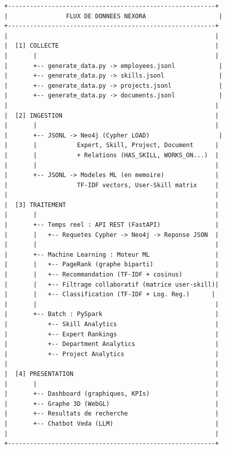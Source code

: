 \documentclass[12pt,a4paper]{article}
\begin{document}
\begin{verbatim}
  +---------------------------------------------------------+
  |                FLUX DE DONNEES NEXORA                    |
  +---------------------------------------------------------+
  |                                                         |
  |  [1] COLLECTE                                           |
  |       |                                                 |
  |       +-- generate_data.py -> employees.jsonl            |
  |       +-- generate_data.py -> skills.jsonl               |
  |       +-- generate_data.py -> projects.jsonl             |
  |       +-- generate_data.py -> documents.jsonl            |
  |                                                         |
  |  [2] INGESTION                                          |
  |       |                                                 |
  |       +-- JSONL -> Neo4j (Cypher LOAD)                   |
  |       |           Expert, Skill, Project, Document      |
  |       |           + Relations (HAS_SKILL, WORKS_ON...)  |
  |       |                                                 |
  |       +-- JSONL -> Modeles ML (en memoire)              |
  |                   TF-IDF vectors, User-Skill matrix     |
  |                                                         |
  |  [3] TRAITEMENT                                         |
  |       |                                                 |
  |       +-- Temps reel : API REST (FastAPI)               |
  |       |   +-- Requetes Cypher -> Neo4j -> Reponse JSON  |
  |       |                                                 |
  |       +-- Machine Learning : Moteur ML                  |
  |       |   +-- PageRank (graphe biparti)                 |
  |       |   +-- Recommandation (TF-IDF + cosinus)         |
  |       |   +-- Filtrage collaboratif (matrice user-skill)|
  |       |   +-- Classification (TF-IDF + Log. Reg.)      |
  |       |                                                 |
  |       +-- Batch : PySpark                               |
  |           +-- Skill Analytics                           |
  |           +-- Expert Rankings                           |
  |           +-- Department Analytics                      |
  |           +-- Project Analytics                         |
  |                                                         |
  |  [4] PRESENTATION                                       |
  |       |                                                 |
  |       +-- Dashboard (graphiques, KPIs)                  |
  |       +-- Graphe 3D (WebGL)                             |
  |       +-- Resultats de recherche                        |
  |       +-- Chatbot Veda (LLM)                            |
  |                                                         |
  +---------------------------------------------------------+
\end{verbatim}
\end{document}
